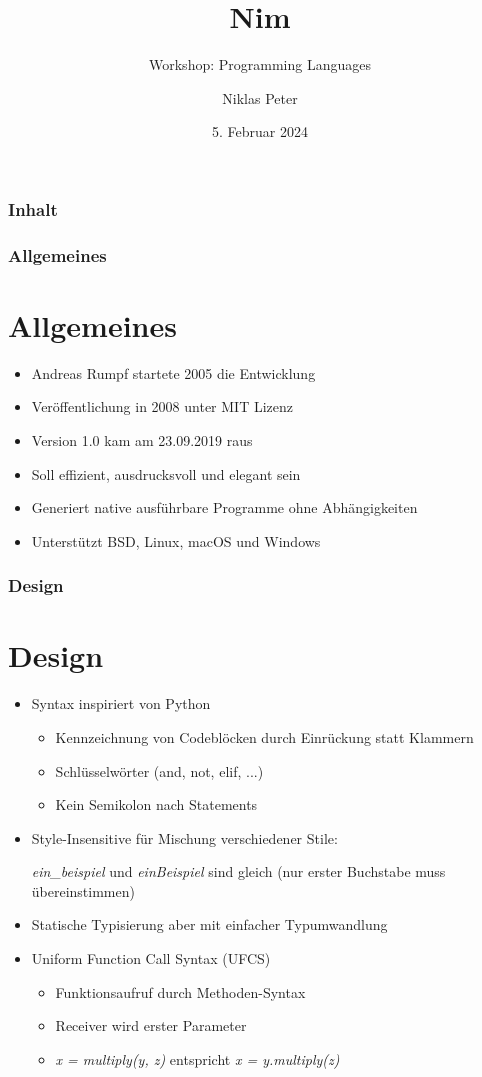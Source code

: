 \documentclass{beamer}
\title{Nim}
\subtitle{Workshop: Programming Languages}
\author{Niklas Peter}
\institute{Universität Siegen}
\date{5. Februar 2024}
\begin{document}
\begin{frame}
\titlepage
\end{frame}


\begin{frame}
\frametitle{Inhalt}
\tableofcontents
\end{frame}


\begin{frame}
\frametitle{Allgemeines}
\section{Allgemeines}
\begin{itemize}
	\item Andreas Rumpf startete 2005 die Entwicklung
	\item Veröffentlichung in 2008 unter MIT Lizenz
	\item Version 1.0 kam am 23.09.2019 raus
	\item Soll effizient, ausdrucksvoll und elegant sein
	\item Generiert native ausführbare Programme ohne Abhängigkeiten
	\item Unterstützt BSD, Linux, macOS und Windows
\end{itemize}
\end{frame}


\begin{frame}
\frametitle{Design}
\section{Design}
\begin{itemize}
	\item Syntax inspiriert von Python
	\begin{itemize}
		\item Kennzeichnung von Codeblöcken durch Einrückung statt Klammern
		\item Schlüsselwörter (and, not, elif, ...)
		\item Kein Semikolon nach Statements
	\end{itemize}
	\item Style-Insensitive für Mischung verschiedener Stile:
	
	\emph{ein\_beispiel} und \emph{einBeispiel} sind gleich (nur erster Buchstabe muss übereinstimmen)
	\item Statische Typisierung aber mit einfacher Typumwandlung
	\item Uniform Function Call Syntax (UFCS)
	\begin{itemize}
		\item Funktionsaufruf durch Methoden-Syntax
		\item Receiver wird erster Parameter
		\item \emph{x = multiply(y, z)} entspricht \emph{x = y.multiply(z)}
	\end{itemize}
\end{itemize}
\end{frame}
\end{document}
